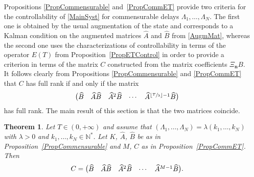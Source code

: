 \documentclass[10pt]{amsart}
\newcommand{\bn}{\boldsymbol{n}}
\renewenvironment{bmatrix}{\bigl(\begin{matrix}}{\end{matrix}\bigr)}
\theoremstyle{plain}
\newtheorem{theo}{Theorem}[section]
\theoremstyle{definition}
\newcommand{\floor}[1]{\left\lfloor #1 \right\rfloor}
\begin{document}
Propositions \ref{PropCommensurable} and~\ref{PropCommET} provide two criteria for the controllability of \eqref{MainSyst} for commensurable delays $\Lambda_1, \dots, \Lambda_N$. The first one is obtained by the usual augmentation of the state and corresponds to a Kalman condition on the augmented matrices $\widehat A$ and $\widehat B$ from \eqref{AugmMat}, whereas the second one uses the characterizations of controllability in terms of the operator $E(T)$ from Proposition~\ref{PropETControl} in order to provide a criterion in terms of the matrix $C$ constructed from the matrix coefficients $\Xi_{\bn} B$. It follows clearly from Propositions \ref{PropCommensurable} and \ref{PropCommET} that $C$ has full rank if and only if the matrix
\[
\begin{bmatrix}
\widehat B & \widehat A \widehat B & \widehat A^2 \widehat B & \cdots & \widehat A^{\floor{\sfrac{T}{\lambda}}-1} \widehat B
\end{bmatrix}
\]
has full rank. The main result of this section is that the two matrices coincide.

\begin{theo}
\label{TheoCommens}
Let $T \in (0, +\infty)$ and assume that $(\Lambda_1, \dots, \Lambda_N) = \lambda (k_1, \dots, k_N)$ with $\lambda > 0$ and $k_1, \dots,  k_N \in \mathbb N^\ast$. Let $K$, $\widehat A$, $\widehat B$ be as in Proposition~\ref{PropCommensurable} and $M$, $C$ as in Proposition~\ref{PropCommET}. Then
\[C = \begin{bmatrix}\widehat B & \widehat A \widehat B & \widehat A^2 \widehat B & \cdots & \widehat A^{M-1} \widehat B\end{bmatrix}.\]
\end{theo}
\end{document}
